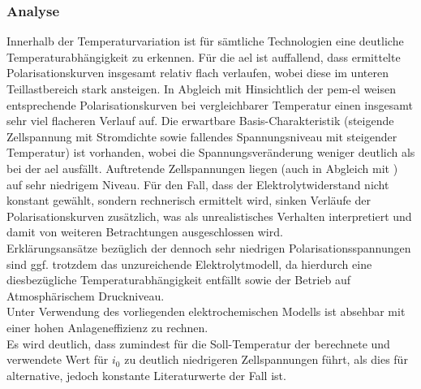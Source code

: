 \documentclass[onecolumn,10pt,titlepage]{article}
\begin{document}
\subsubsection*{Analyse}
Innerhalb der Temperaturvariation ist für sämtliche Technologien eine deutliche Temperaturabhängigkeit zu erkennen. Für die \gls{ael} ist auffallend, dass ermittelte Polarisationskurven insgesamt relativ flach verlaufen, wobei diese im unteren Teillastbereich stark ansteigen. In Abgleich mit \cite{Buttler.2018}
Hinsichtlich der \gls{pem}-\gls{el} weisen entsprechende Polarisationskurven bei vergleichbarer Temperatur einen insgesamt sehr viel flacheren Verlauf auf.
Die erwartbare Basis-Charakteristik (steigende Zellspannung mit Stromdichte sowie fallendes Spannungsniveau mit steigender Temperatur) ist vorhanden, wobei die Spannungsveränderung weniger deutlich als bei der \gls{ael} ausfällt. Auftretende Zellspannungen liegen (auch in Abgleich mit \cite{Buttler.2018}) auf sehr niedrigem Niveau. Für den Fall, dass der Elektrolytwiderstand nicht konstant gewählt, sondern rechnerisch ermittelt wird, sinken Verläufe der Polarisationskurven zusätzlich, was als unrealistisches Verhalten interpretiert und damit von weiteren Betrachtungen ausgeschlossen wird.\\ 
Erklärungsansätze bezüglich der dennoch sehr niedrigen Polarisationsspannungen sind ggf. trotzdem das unzureichende Elektrolytmodell, da hierdurch eine diesbezügliche Temperaturabhängigkeit entfällt sowie der Betrieb auf Atmosphärischem Druckniveau.\\
Unter Verwendung des vorliegenden elektrochemischen Modells ist absehbar mit einer hohen Anlageneffizienz zu rechnen.\\
Es wird deutlich, dass zumindest für die Soll-Temperatur der berechnete und verwendete Wert für $i_0$ zu deutlich niedrigeren Zellspannungen führt, als dies für alternative, jedoch konstante Literaturwerte der Fall ist.\\ 
\end{document}
